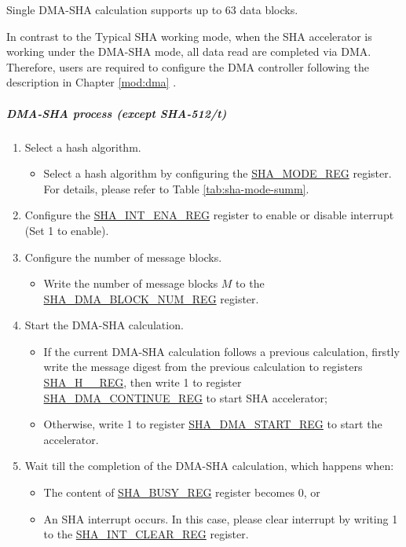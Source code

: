 \documentclass[main\_\_EN.tex]{subfiles}
\begin{document}
Single DMA-SHA calculation supports up to 63 data blocks.

In contrast to the Typical SHA working mode, when the SHA accelerator is working under the DMA-SHA mode, all data read are completed via DMA. Therefore, users are required to configure the DMA controller following the description in Chapter \ref{mod:dma} \textit{}.

\subparagraph{DMA-SHA process (except SHA-512/{\it{t}})}

\begin{enumerate}
    \item Select a hash algorithm.
    \begin{itemize}
        \item Select a hash algorithm by configuring the \hyperref[regdesc:SHAMODEREG]{SHA\_MODE\_REG} register. For details, please refer to Table \ref{tab:sha-mode-summ}.
    \end{itemize}
    \item Configure the \hyperref[regdesc:SHAINTENAREG]{SHA\_INT\_ENA\_REG} register to enable or disable interrupt (Set 1 to enable).
    \item Configure the number of message blocks.
    \begin{itemize}
        \item  Write the number of message blocks \begin{math}M\end{math} to the  \hyperref[regdesc:SHADMABLOCKNUMREG]{SHA\_DMA\_BLOCK\_NUM\_REG} register.
    \end{itemize}
    \item Start the DMA-SHA calculation.
        \begin{itemize}
            \item If the current DMA-SHA calculation follows a previous calculation, firstly write the message digest from the previous calculation to registers \hyperref[regdesc:SHAHNREG]{SHA\_H\_\_REG}, then write 1 to register \hyperref[regdesc:SHADMACONTINUEREG]{SHA\_DMA\_CONTINUE\_REG} to start SHA accelerator;
            \item Otherwise, write 1 to register \hyperref[regdesc:SHADMASTARTREG]{SHA\_DMA\_START\_REG} to start the accelerator.
        \end{itemize}
    \item Wait till the completion of the DMA-SHA calculation, which happens when:
        \begin{itemize}
            \item The content of \hyperref[regdesc:SHABUSYREG]{SHA\_BUSY\_REG} register becomes 0, or
            \item An SHA interrupt occurs. In this case, please clear interrupt by writing 1 to the \hyperref[regdesc:SHAINTCLEARREG]{SHA\_INT\_CLEAR\_REG} register.
        \end{itemize}


\end{enumerate}
\end{document}
